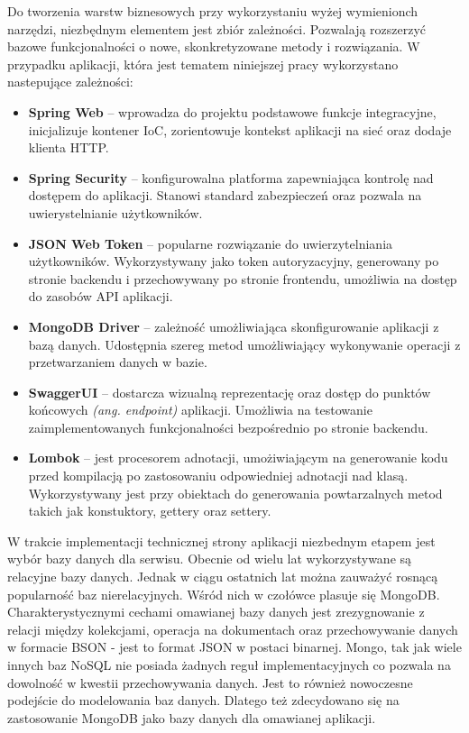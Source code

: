 Do tworzenia warstw biznesowych przy wykorzystaniu wyżej wymienionch narzędzi, niezbędnym elementem jest zbiór zależności. Pozwalają rozszerzyć bazowe funkcjonalności o nowe, skonkretyzowane metody i rozwiązania. W przypadku aplikacji, która jest tematem niniejszej pracy wykorzystano nastepujące zależności:
\begin{itemize}[leftmargin=1cm]
    \item \textbf{Spring Web} -- wprowadza do projektu podstawowe funkcje integracyjne, inicjalizuje kontener IoC, zorientowuje kontekst aplikacji na sieć oraz dodaje klienta HTTP.
    \item \textbf{Spring Security} -- konfigurowalna platforma zapewniająca kontrolę nad dostępem do aplikacji. Stanowi standard zabezpieczeń oraz pozwala na uwierystelnianie użytkowników.
    \item \textbf{JSON Web Token} -- popularne rozwiązanie do uwierzytelniania użytkowników. Wykorzystywany jako token autoryzacyjny, generowany po stronie backendu i przechowywany po stronie frontendu, umożliwia na dostęp do zasobów API aplikacji.
    \item \textbf{MongoDB Driver} -- zależność umożliwiająca skonfigurowanie aplikacji z bazą danych. Udostępnia szereg metod umożliwiający wykonywanie operacji z przetwarzaniem danych w bazie.
    \item \textbf{SwaggerUI} -- dostarcza wizualną reprezentację oraz dostęp do punktów końcowych \textit{(ang. endpoint)} aplikacji. Umożliwia na testowanie zaimplementowanych funkcjonalności bezpośrednio po stronie backendu.
    \item \textbf{Lombok} -- jest procesorem adnotacji, umożiwiającym na generowanie kodu przed kompilacją po zastosowaniu odpowiedniej adnotacji nad klasą. Wykorzystywany jest przy obiektach do generowania powtarzalnych metod takich jak konstuktory, gettery oraz settery.
\end{itemize}

W trakcie implementacji technicznej strony aplikacji niezbednym etapem jest wybór bazy danych dla serwisu. Obecnie od wielu lat wykorzystywane są relacyjne bazy danych. Jednak w ciągu ostatnich lat można zauważyć rosnącą popularność baz nierelacyjnych. Wśród nich w czołówce plasuje się MongoDB. Charakterystycznymi cechami omawianej bazy danych jest zrezygnowanie z relacji między kolekcjami, operacja na dokumentach oraz przechowywanie danych w formacie BSON - jest to format JSON w postaci binarnej. Mongo, tak jak wiele innych baz NoSQL nie posiada żadnych reguł implementacyjnych co pozwala na dowolność w kwestii przechowywania danych. Jest to również nowoczesne podejście do modelowania baz danych. Dlatego też zdecydowano się na zastosowanie MongoDB jako bazy danych dla omawianej aplikacji.

